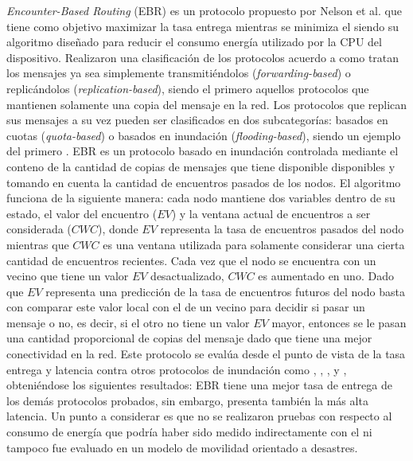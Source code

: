\textit{Encounter-Based Routing} (EBR) \cite{ebr} es un protocolo propuesto por
Nelson et al. que tiene como objetivo maximizar la tasa entrega mientras se
minimiza el \overhead{} siendo su algoritmo diseñado para reducir el consumo
energía utilizado por la CPU del dispositivo. Realizaron una clasificación de
los protocolos acuerdo a como tratan los mensajes ya sea simplemente
transmitiéndolos (\textit{forwarding-based}) o replicándolos
(\textit{replication-based}), siendo el primero aquellos protocolos que
mantienen solamente una copia del mensaje en la red.  Los protocolos que
replican sus mensajes a su vez pueden ser clasificados en dos subcategorías:
basados en cuotas (\textit{quota-based}) o basados en inundación
(\textit{flooding-based}), siendo un ejemplo del primero \syw. EBR es un
protocolo basado en inundación controlada mediante el conteno de la cantidad de
copias de mensajes que tiene disponible disponibles y tomando en cuenta la
cantidad de encuentros pasados de los nodos. El algoritmo funciona de la
siguiente manera: cada nodo mantiene dos variables dentro de su estado, el valor
del encuentro ($EV$) y la ventana actual de encuentros a ser considerada
($CWC$), donde $EV$ representa la tasa de encuentros pasados del nodo mientras
que $CWC$ es una ventana utilizada para solamente considerar una cierta cantidad
de encuentros recientes.  Cada vez que el nodo se encuentra con un vecino que
tiene un valor $EV$ desactualizado, $CWC$ es aumentado en uno.  Dado que $EV$
representa una predicción de la tasa de encuentros futuros del nodo basta con
comparar este valor local con el de un vecino para decidir si pasar un mensaje o
no, es decir, si el otro no tiene un valor $EV$ mayor, entonces se le pasan una
cantidad proporcional de copias del mensaje dado que tiene una mejor
conectividad en la red. Este protocolo se evalúa desde el punto de vista de la
tasa entrega y latencia contra otros protocolos de inundación como \maxprop,
\prophet, \epidemic, \syw{} y \syf, obteniéndose los siguientes resultados: EBR
tiene una mejor tasa de entrega de los demás protocolos probados, sin embargo,
presenta también la más alta latencia. Un punto a considerar es que no se
realizaron pruebas con respecto al consumo de energía que podría haber sido
medido indirectamente con el \overhead{} ni tampoco fue evaluado en un modelo de
movilidad orientado a desastres.


